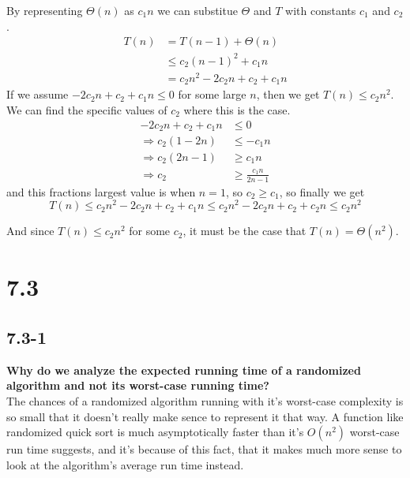 \documentclass[11pt]{article}
\begin{document}
 By representing $\Theta (n)$ as $c_1 n$ we can substitue $\Theta$ and $T$ with constants $c_1$ and $c_2$.
 \begin{align*}
   && T(n) &= T(n-1) + \Theta (n) && \\
   && & \leq c_2 (n-1)^2 + c_1 n && \\
   && &= c_2 n^2 - 2c_2 n + c_2 + c_1 n &&
 \end{align*}
 If we assume $-2c_2 n + c_2 + c_1 n \leq 0$ for some large $n$, then we get $T(n) \leq c_2 n^2$.
 We can find the specific values of $c_2$ where this is the case. 
 \begin{align*}
   && -2c_2 n + c_2 + c_1 n &\leq 0 && \\
   && \Rightarrow  c_2(1 - 2n) &\leq -c_1 n && \\
   && \Rightarrow c_2(2n - 1) &\geq c_1 n && \\
   && \Rightarrow c_2 &\geq \frac{c_1 n}{2n-1} &&
 \end{align*}
 and this fractions largest value is when $n=1$, so $c_2 \geq c_1$, so finally we get
 $$T(n) \leq c_2 n^2 - 2c_2 n + c_2 + c_1 n \leq c_2 n^2 - 2c_2 n + c_2 + c_2 n \leq c_2 n^2$$

 And since $T(n) \leq c_2 n^2$ for some $c_2$, it must be the case that $T(n) = \Theta(n^2)$.
 \newpage
 \section*{7.3} 

 \subsection*{7.3-1}
 \textbf{Why do we analyze the expected running time of a randomized algorithm and not its worst-case 
 running time?} \\

 The chances of a randomized algorithm running with it's worst-case complexity is so small that it doesn't really make 
 sence to represent it that way.  A function like randomized quick sort is much asymptotically 
 faster than it's $O(n^2)$ worst-case run time suggests, and it's because of this fact, that it makes much 
 more sense to look at the algorithm's average run time instead.
\end{document}
